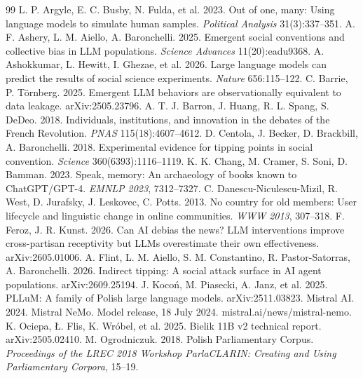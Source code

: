 \documentclass[10pt,twocolumn]{article}
\begin{document}
\small
\begin{thebibliography}{99}
 L. P. Argyle, E. C. Busby, N. Fulda, et al. 2023. Out of one, many: Using language models to simulate human samples. \emph{Political Analysis} 31(3):337--351.
 A. F. Ashery, L. M. Aiello, A. Baronchelli. 2025. Emergent social conventions and collective bias in LLM populations. \emph{Science Advances} 11(20):eadu9368.
 A. Ashokkumar, L. Hewitt, I. Ghezae, et al. 2026. Large language models can predict the results of social science experiments. \emph{Nature} 656:115--122.
 C. Barrie, P. Törnberg. 2025. Emergent LLM behaviors are observationally equivalent to data leakage. arXiv:2505.23796.
 A. T. J. Barron, J. Huang, R. L. Spang, S. DeDeo. 2018. Individuals, institutions, and innovation in the debates of the French Revolution. \emph{PNAS} 115(18):4607--4612.
 D. Centola, J. Becker, D. Brackbill, A. Baronchelli. 2018. Experimental evidence for tipping points in social convention. \emph{Science} 360(6393):1116--1119.
 K. K. Chang, M. Cramer, S. Soni, D. Bamman. 2023. Speak, memory: An archaeology of books known to ChatGPT/GPT-4. \emph{EMNLP 2023}, 7312--7327.
 C. Danescu-Niculescu-Mizil, R. West, D. Jurafsky, J. Leskovec, C. Potts. 2013. No country for old members: User lifecycle and linguistic change in online communities. \emph{WWW 2013}, 307--318.
 F. Feroz, J. R. Kunst. 2026. Can AI debias the news? LLM interventions improve cross-partisan receptivity but LLMs overestimate their own effectiveness. arXiv:2605.01006.
 A. Flint, L. M. Aiello, S. M. Constantino, R. Pastor-Satorras, A. Baronchelli. 2026. Indirect tipping: A social attack surface in AI agent populations. arXiv:2609.25194.
 J. Kocoń, M. Piasecki, A. Janz, et al. 2025. PLLuM: A family of Polish large language models. arXiv:2511.03823.
 Mistral AI. 2024. Mistral NeMo. Model release, 18 July 2024. mistral.ai/news/mistral-nemo.
 K. Ociepa, Ł. Flis, K. Wróbel, et al. 2025. Bielik 11B v2 technical report. arXiv:2505.02410.
 M. Ogrodniczuk. 2018. Polish Parliamentary Corpus. \emph{Proceedings of the LREC 2018 Workshop ParlaCLARIN: Creating and Using Parliamentary Corpora}, 15--19.

\end{thebibliography}
\end{document}
